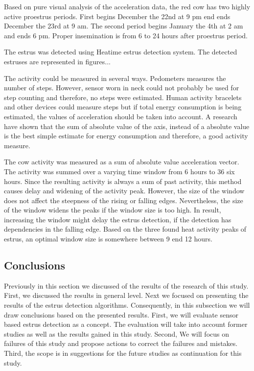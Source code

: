 \documentclass[english,12pt,a4paper,pdftex,elec,utf8]{aaltothesis}
\begin{document}
Based on pure visual analysis of the acceleration data, the red cow has two highly active proestrus periods. First begins December the 22nd at 9 pm end ends December the 23rd at 9 am. The second period begins January the 4th at 2 am and ends 6 pm. Proper insemination is from 6 to 24 hours after proestrus period.

The estrus was detected using Heatime estrus detection system. The detected estruses are represented in figures...





The activity could be measured in several ways. Pedometers measures the number of steps. However, sensor worn in neck could not probably be used for step counting and therefore, no steps were estimated. Human activity bracelets and other devices could measure steps but if total energy consumption is being estimated, the values of acceleration should be taken into account. A research have shown that the sum of absolute value of the axis, instead of a absolute value is the best simple estimate for energy consumption and therefore, a good activity measure.

The cow activity was measured as a sum of absolute value acceleration vector. The activity was summed over a varying time window from 6 hours to 36 six hours. Since the resulting activity is always a sum of past activity, this method causes delay and widening of the activity peak. However, the size of the window does not affect the steepness of the rising or falling edges. Nevertheless, the size of the window widens the peaks if the window size is too high. In result, increasing the window might delay the estrus detection, if the detection has dependencies in the falling edge. Based on the three found heat activity peaks of estrus, an optimal window size is somewhere between 9 end 12 hours.



\subsection{Conclusions} \label{conclusionssection}

Previously in this section we discussed of the results of the research of this study. First, we discussed the results in general level. Next we focused on presenting the results of the estrus detection algorithms. Consequently, in this subsection we will draw conclusions based on the presented results. First, we will evaluate sensor based estrus detection as a concept. The evaluation will take into account former studies as well as the results gained in this study. Second, We will focus on failures of this study and propose actions to correct the failures and mistakes. Third, the scope is in suggestions for the future studies as continuation for this study.
\end{document}
